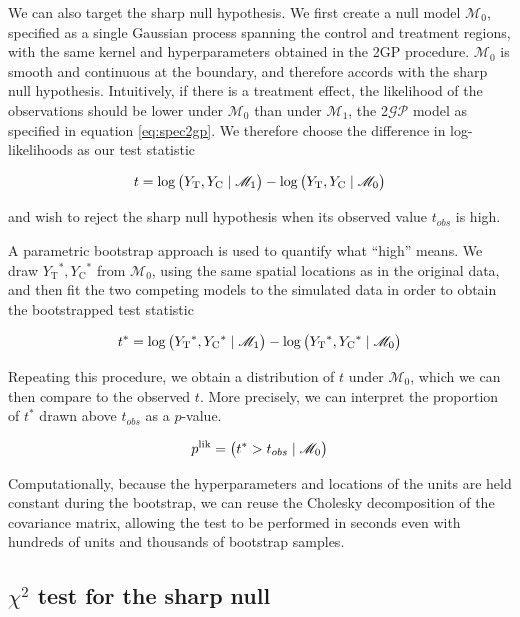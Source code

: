\documentclass[letter]{article}
\let\Pr\relax
\DeclareMathOperator{\Pr}{\mathbb{P}}
\newcommand{\gp}{\mathcal{GP}}
\newcommand{\treat}{\mathrm{T}}
\newcommand{\ctrol}{\mathrm{C}}
\newcommand{\modnull}{\mathscr{M}_0}
\newcommand{\modalt}{\mathscr{M}_1}
\begin{document}
We can also target the sharp null hypothesis.
We first create a null model \(\modnull\),
specified as a single Gaussian process spanning the control and treatment regions,
with the same kernel and hyperparameters obtained in the 2GP procedure.
\(\modnull\) is smooth and continuous at the boundary,
and therefore accords with the sharp null hypothesis.
Intuitively, if there is a treatment effect,
the likelihood of the observations should be lower under \(\modnull\) than under \(\modalt\),
the 2\(\gp\) model as specified in equation \eqref{eq:spec2gp}.
We therefore choose the difference in log-likelihoods as our test statistic

\begin{equation}
    t = \log \Pr\del{Y_\treat{}, Y_\ctrol{} \mid \modalt} - \log \Pr\del{Y_\treat{}, Y_\ctrol{} \mid \modnull}
\end{equation}

and wish to reject the sharp null hypothesis when its observed value \(t_{obs}\) is high.

A parametric bootstrap approach is used to quantify what ``high'' means. We draw \(Y_\treat{}^*,Y_\ctrol{}^*\) from \(\modnull\),
using the same spatial locations as in the original data,
and then fit the two competing models to the simulated data in order to obtain the bootstrapped test statistic

\begin{equation}
    t^* = \log \Pr\del{Y_\treat{}^*, Y_\ctrol{}^* \mid \modalt} - \log \Pr\del{Y_\treat{}^*, Y_\ctrol{}^* \mid \modnull}
\end{equation}

Repeating this procedure, we obtain a distribution of \(t\) under \(\modnull\),
which we can then compare to the observed \(t\).
More precisely, we can interpret the proportion of \(t^*\) drawn above \(t_{obs}\) as a \(p\)-value.

\begin{equation}
    p^{\mathrm{lik}} = \Pr\del{t^* > t_{obs} \mid \modnull}
\end{equation}

Computationally, because the hyperparameters and locations of the units are held constant during the bootstrap, we can reuse the Cholesky decomposition of the covariance matrix, allowing the test to be performed in seconds even with hundreds of units and thousands of bootstrap samples.
    


    	\subsection{\texorpdfstring{\(\chi^2\) test for the sharp null}{\textbackslash{}chi\^{}2 test for the sharp null}}\label{chi2-test-for-the-sharp-null}
\end{document}

